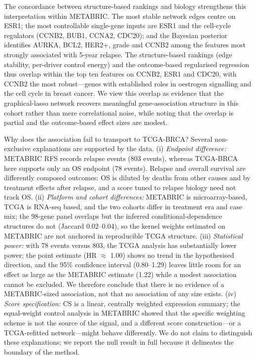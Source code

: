 \documentclass[12pt]{article}
\begin{document}
The concordance between structure-based rankings and biology strengthens
this interpretation within METABRIC. The most stable network edges centre on
ESR1; the most controllable single-gene inputs are ESR1 and the cell-cycle
regulators (CCNB2, BUB1, CCNA2, CDC20); and the Bayesian posterior
identifies AURKA, BCL2, HER2+, grade and CCNB2 among the features most
strongly associated with 5-year relapse. The structure-based rankings
(edge stability, per-driver control energy) and the outcome-based regularised
regression thus overlap within the top ten features on CCNB2, ESR1 and
CDC20, with CCNB2 the most robust---genes with established
roles in oestrogen signalling and the cell cycle in breast cancer. We view
this overlap as evidence that the graphical-lasso network recovers
meaningful gene-association structure in this cohort rather than mere
correlational noise, while noting that the overlap is partial and the
outcome-based effect sizes are modest.

Why does the association fail to transport to TCGA-BRCA? Several non-exclusive
explanations are supported by the data. (i) \emph{Endpoint difference:}
METABRIC RFS records relapse events (803 events), whereas TCGA-BRCA here
supports only an OS endpoint (78 events). Relapse and overall survival are
differently composed outcomes: OS is diluted by deaths from other causes and
by treatment effects after relapse, and a score tuned to relapse biology
need not track OS. (ii) \emph{Platform and cohort differences:} METABRIC is
microarray-based, TCGA is RNA-seq based, and the two cohorts differ in
treatment era and case mix; the 98-gene panel overlaps but the inferred
conditional-dependence structures do not (Jaccard 0.02--0.04), so the
kernel weights estimated on METABRIC are not anchored in reproducible TCGA
structure. (iii) \emph{Statistical power:} with 78 events versus 803, the
TCGA analysis has substantially lower power; the point estimate (HR
$\approx$ 1.00) shows no trend in the hypothesised direction, and the 95\%
confidence interval (0.80--1.29) leaves little room for an effect as large
as the METABRIC estimate (1.22) while a modest association cannot be
excluded. We therefore conclude that there is no evidence of a
METABRIC-sized association, not that no association of any size exists. (iv) \emph{Score specification:} CS
is a linear, centrally weighted expression summary; the equal-weight control
analysis in METABRIC showed that the specific weighting scheme is not the
source of the signal, and a different score construction---or a
TCGA-refitted network---might behave differently. We do not claim to
distinguish these explanations; we report the null result in full because it
delineates the boundary of the method.
\end{document}

